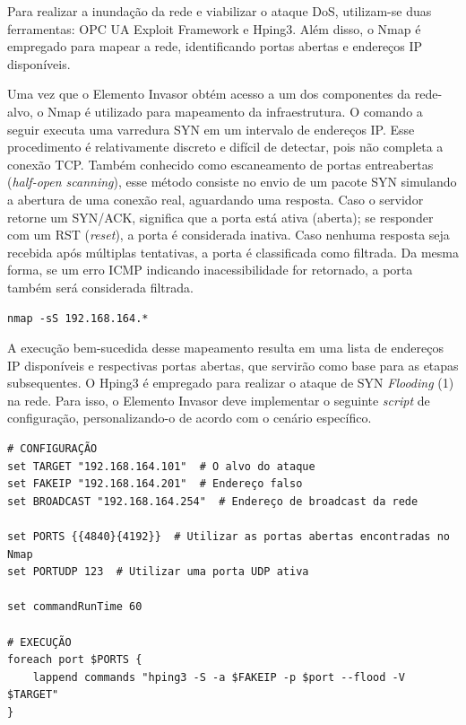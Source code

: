         Para realizar a inundação da rede e viabilizar o ataque DoS, utilizam-se duas ferramentas: OPC UA Exploit Framework e Hping3. Além disso, o Nmap é empregado para mapear a rede, identificando portas abertas e endereços IP disponíveis.

        Uma vez que o Elemento Invasor obtém acesso a um dos componentes da rede-alvo, o Nmap é utilizado para mapeamento da infraestrutura. O comando a seguir executa uma varredura SYN em um intervalo de endereços IP. Esse procedimento é relativamente discreto e difícil de detectar, pois não completa a conexão TCP. Também conhecido como escaneamento de portas entreabertas (\textit{half-open scanning}), esse método consiste no envio de um pacote SYN simulando a abertura de uma conexão real, aguardando uma resposta. Caso o servidor retorne um SYN/ACK, significa que a porta está ativa (aberta); se responder com um RST (\textit{reset}), a porta é considerada inativa. Caso nenhuma resposta seja recebida após múltiplas tentativas, a porta é classificada como filtrada. Da mesma forma, se um erro ICMP indicando inacessibilidade for retornado, a porta também será considerada filtrada.

        \begin{verbatim}
nmap -sS 192.168.164.*
        \end{verbatim}

        A execução bem-sucedida desse mapeamento resulta em uma lista de endereços IP disponíveis e respectivas portas abertas, que servirão como base para as etapas subsequentes. O Hping3 é empregado para realizar o ataque de SYN \textit{Flooding} (1) na rede. Para isso, o Elemento Invasor deve implementar o seguinte \textit{script} de configuração, personalizando-o de acordo com o cenário específico.


        \begin{verbatim}
# CONFIGURAÇÃO
set TARGET "192.168.164.101"  # O alvo do ataque
set FAKEIP "192.168.164.201"  # Endereço falso
set BROADCAST "192.168.164.254"  # Endereço de broadcast da rede

set PORTS {{4840}{4192}}  # Utilizar as portas abertas encontradas no Nmap
set PORTUDP 123  # Utilizar uma porta UDP ativa

set commandRunTime 60

# EXECUÇÃO
foreach port $PORTS {
    lappend commands "hping3 -S -a $FAKEIP -p $port --flood -V $TARGET"
}
        \end{verbatim}

